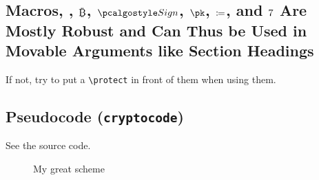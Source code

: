\subsection{Macros, \eg, $\btcsym$, $\algo{Sign}$, $\pk$, $\coloneq$, and $\xmark$ Are Mostly Robust and Can Thus be Used in Movable Arguments like Section Headings}
If not, try to put a \verb|\protect| in front of them when using them.


\subsection{Pseudocode (\texttt{cryptocode})}
See the source code.
\begin{figure}[tbhp]
  \begin{center}
    \begin{tcolorbox}[width=10cm]
      \begin{pchstack}[center]
        \begin{pcvstack}
          \pcvspace
        \end{pcvstack}
        \pchspace[1em]
        \begin{pcvstack}
          \pcvspace
        \end{pcvstack}
      \end{pchstack}
    \end{tcolorbox}
  \end{center}
  \caption{My great scheme\label{fig:scheme}}  %
\end{figure}

\clearpage
